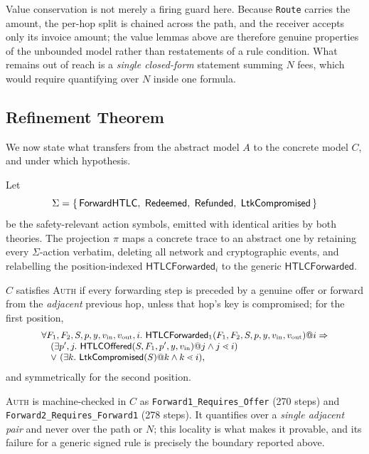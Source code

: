 \documentclass[sigconf,review]{acmart}
\theoremstyle{acmdefinition}
\begin{document}
Value conservation is not merely a firing guard here. Because \texttt{Route} carries the amount, the per-hop split is chained across the path, and the receiver accepts only its invoice amount; the value lemmas above are therefore genuine properties of the unbounded model rather than restatements of a rule condition. What remains out of reach is a \emph{single closed-form} statement summing $N$ fees, which would require quantifying over $N$ inside one formula.

\subsection{Refinement Theorem}
We now state what transfers from the abstract model $A$ to the concrete model $C$, and under which hypothesis.

\begin{definition}
\label{def:proj}
Let
\[
\small
\Sigma = \{\,\mathsf{ForwardHTLC},\ \mathsf{Redeemed},\ \mathsf{Refunded},\ \mathsf{LtkCompromised}\,\}
\]
be the safety-relevant action symbols, emitted with identical arities by both theories. The projection $\pi$ maps a concrete trace to an abstract one by retaining every $\Sigma$-action verbatim, deleting all network and cryptographic events, and relabelling the position-indexed $\mathsf{HTLCForwarded}_i$ to the generic $\mathsf{HTLCForwarded}$.
\end{definition}

\begin{definition}
\label{def:auth}
$C$ satisfies \textsc{Auth} if every forwarding step is preceded by a genuine offer or forward from the \emph{adjacent} previous hop, unless that hop's key is compromised; for the first position,
\[
\small
\begin{array}{l}
\forall F_1,F_2,S,p,y,v_{\mathrm{in}},v_{\mathrm{out}},i.\
 \mathsf{HTLCForwarded}_1(F_1,F_2,S,p,y,v_{\mathrm{in}},v_{\mathrm{out}})@i \Rightarrow\\
\quad (\exists p',j.\ \mathsf{HTLCOffered}(S,F_1,p',y,v_{\mathrm{in}})@j \wedge j \lessdot i)\\
\quad \vee\ (\exists k.\ \mathsf{LtkCompromised}(S)@k \wedge k \lessdot i),
\end{array}
\]
and symmetrically for the second position.
\end{definition}

\textsc{Auth} is machine-checked in $C$ as \texttt{Forward1\_Requires\_Offer} (270 steps) and \texttt{Forward2\_Requires\_Forward1} (278 steps). It quantifies over a \emph{single adjacent pair} and never over the path or $N$; this locality is what makes it provable, and its failure for a generic signed rule is precisely the boundary reported above.
\end{document}
